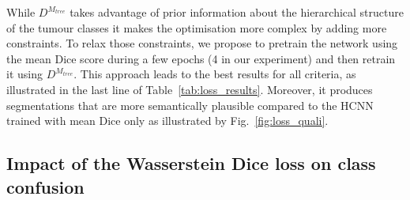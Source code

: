 \documentclass[runningheads,orivec,a4paper]{llncs}
\begin{document}
While $D^{M_{tree}}$ takes advantage of prior information about the hierarchical structure of the tumour classes it makes the optimisation more complex by adding more constraints.
To relax those constraints, we propose to pretrain the network using the mean Dice score during a few epochs (4 in our experiment) and then retrain it using $D^{M_{tree}}$.
This approach leads to the best results for all criteria, as illustrated in the last line of Table~\ref{tab:loss_results}.
Moreover, it produces segmentations that are more semantically plausible compared to the HCNN trained with mean Dice only as illustrated by Fig.~\ref{fig:loss_quali}.

\subsection{Impact of the Wasserstein Dice loss on class confusion}
\end{document}
